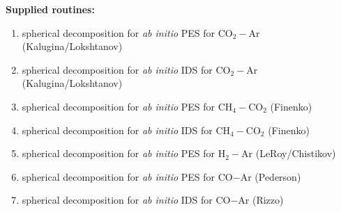 \documentclass{article}
\begin{document}
\noindent
\textbf{Supplied routines:}
\begin{enumerate}
    \item spherical decomposition for \textit{ab initio} PES for CO$_2-$Ar (Kalugina/Lokshtanov) 
    \item spherical decomposition for \textit{ab initio} IDS for CO$_2-$Ar (Kalugina/Lokshtanov)
    \item spherical decomposition for \textit{ab initio} PES for CH$_4-$CO$_2$ (Finenko)
    \item spherical decomposition for \textit{ab initio} IDS for CH$_4-$CO$_2$ (Finenko)
    \item spherical decomposition for \textit{ab initio} PES for H$_2-$Ar (LeRoy/Chistikov)
    \item spherical decomposition for \textit{ab initio} PES for CO$-$Ar (Pederson)
\item spherical decomposition for \textit{ab initio} IDS for CO$-$Ar (Rizzo)
\end{enumerate}
\end{document}
